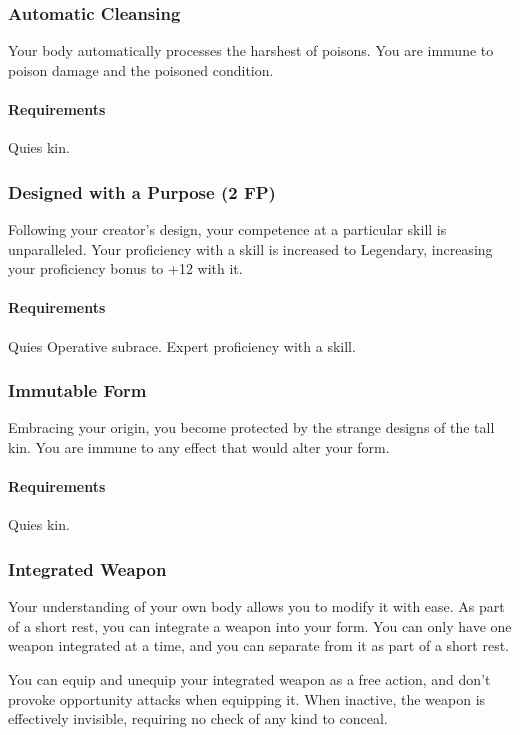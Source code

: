     \subsubsection{Automatic Cleansing} \label{feat::automaticcleansing}
        Your body automatically processes the harshest of poisons.
        You are immune to poison damage and the poisoned condition.
        \paragraph{Requirements} Quies kin.
    \subsubsection{Designed with a Purpose (2 FP)} \label{feat::designedwithapurpose}
        Following your creator's design, your competence at a particular skill is unparalleled.
        Your proficiency with a skill is increased to Legendary, increasing your proficiency bonus to +12 with it.
        \paragraph{Requirements} Quies Operative subrace. Expert proficiency with a skill.
    \subsubsection{Immutable Form} \label{feat::immutableform}
        Embracing your origin, you become protected by the strange designs of the tall kin.
        You are immune to any effect that would alter your form.
        \paragraph{Requirements} Quies kin.
    \subsubsection{Integrated Weapon} \label{feat::integratedweapon}
        Your understanding of your own body allows you to modify it with ease.
        As part of a short rest, you can integrate a weapon into your form.
        You can only have one weapon integrated at a time, and you can separate from it as part of a short rest.

        You can equip and unequip your integrated weapon as a free action, and don't provoke opportunity attacks when equipping it.
        When inactive, the weapon is effectively invisible, requiring no check of any kind to conceal.

